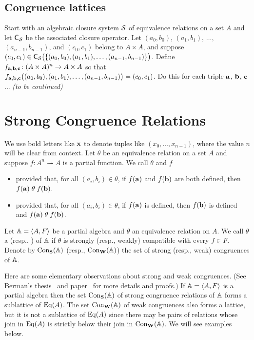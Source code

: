 \subsection{Congruence lattices}
Start with an algebraic closure system $\mathcal{S}$ of equivalence relations on a set
$A$ and let $\operatorname{\mathsf{C}}_{\mathcal{S}}$ be the associated closure operator.
Let $(a_0, b_0)$, $(a_1, b_1)$, $\dots$, $(a_{n-1},b_{n-1})$, and $(c_0,
c_1)$ belong to $A\times A$,
and suppose 
$(c_0,c_1) \in \operatorname{\mathsf{C}}_{\mathcal{S}}\bigl(\{(a_0, b_0), (a_1, b_1), \dots,
(a_{n-1},b_{n-1})\}\bigr)$.
Define $f_{\mathbf{a}, \mathbf{b}, \mathbf{c}}\colon (A\times A)^n \to A\times A$ 
so that
$f_{\mathbf{a}, \mathbf{b}, \mathbf{c}}\bigl((a_0, b_0), (a_1, b_1), \dots, (a_{n-1},b_{n-1})\bigr) =(c_0,c_1)$.
Do this for each triple $\mathbf{a}$, $\mathbf{b}$, $\mathbf{c}$...
{\it (to be continued)}


\section{Strong Congruence Relations}
We use bold letters like $\mathbf{x}$ to denote tuples like $(x_0, \dots, x_{n-1})$,
where the value $n$ will be clear from context.
Let $\theta$ be an equivalence relation on a set $A$ and suppose
$f\colon A^n \rightharpoonup A$ is a partial function.
We call $\theta$ and $f$
\begin{itemize}
\item {} provided that, for all $(a_i, b_i) \in \theta$,
if $f(\mathbf{a})$ and $f(\mathbf{b})$ are both defined, then $f(\mathbf{a}) \mathrel{\theta} f(\mathbf{b})$.
\item {} provided that, for all $(a_i, b_i) \in \theta$,
if $f(\mathbf{a})$ is defined, then $f(\mathbf{b})$ is defined and $f(\mathbf{a}) \mathrel{\theta} f(\mathbf{b})$.
\end{itemize}

Let $\mathbb{A} = \langle A, F\rangle$ be a partial algebra and $\theta$ an equivalence relation on $A$.
We call $\theta$ a  (resp., )  of $\mathbb{A}$
if $\theta$ is strongly (resp., weakly) compatible with every $f\in F$.
Denote by $\operatorname{Con_{\mathbf{S}}}(\mathbb{A})$ (resp., $\operatorname{Con_{\mathbf{W}}}(\mathbb{A})$) the set of strong (resp., weak)
congruences of $\mathbb{A}$.

Here are some elementary observations about strong and weak congruences.
(See Berman's thesis~\cite{MR2619731} and paper~\cite{MR0308011} for more details and proofs.)
If $\mathbb{A} = \langle A, F\rangle$ is a partial algebra then the set $\operatorname{Con_{\mathbf{S}}}(\mathbb{A})$ of strong congruence relations of
$\mathbb{A}$ forms a sublattice of $\operatorname{Eq}(A)$.
The set $\operatorname{Con_{\mathbf{W}}}(\mathbb{A})$ of weak congruences also forms a lattice, but it is not a sublattice of $\operatorname{Eq}(A)$
since there may be pairs of relations whose join in $\operatorname{Eq}(A)$ is strictly below
their join in $\operatorname{Con_{\mathbf{W}}}(\mathbb{A})$. We will see examples below.

